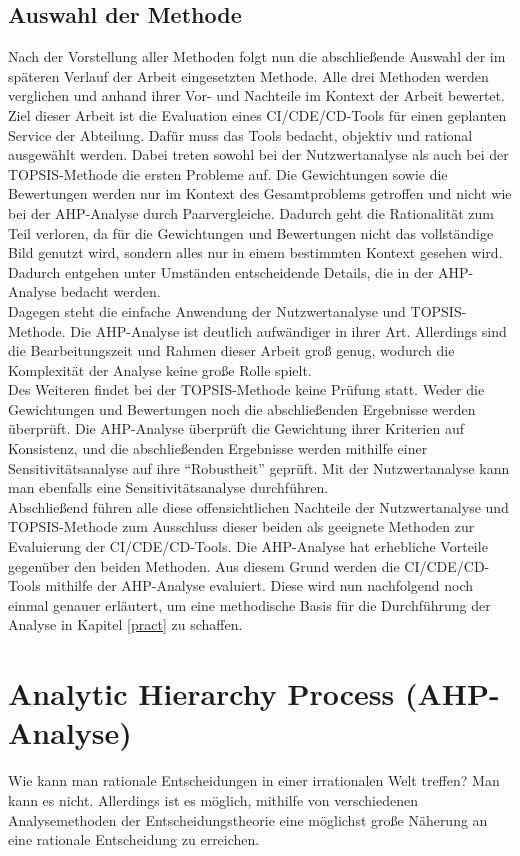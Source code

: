 \subsection{Auswahl der Methode}
Nach der Vorstellung aller Methoden folgt nun die abschließende Auswahl der im späteren Verlauf der Arbeit eingesetzten Methode. Alle drei Methoden werden verglichen und anhand ihrer Vor- und Nachteile im Kontext der Arbeit bewertet.\\
Ziel dieser Arbeit ist die Evaluation eines \ac{CI}/\ac{CDE}/\ac{CD}-Tools für einen geplanten Service der Abteilung. Dafür muss das Tools bedacht, objektiv und rational ausgewählt werden. Dabei treten sowohl bei der Nutzwertanalyse als auch bei der TOPSIS-Methode die ersten Probleme auf. Die Gewichtungen sowie die Bewertungen werden nur im Kontext des Gesamtproblems getroffen und nicht wie bei der AHP-Analyse durch Paarvergleiche. Dadurch geht die Rationalität zum Teil verloren, da für die Gewichtungen und Bewertungen nicht das vollständige Bild genutzt wird, sondern alles nur in einem bestimmten Kontext gesehen wird. Dadurch entgehen unter Umständen entscheidende Details, die in der AHP-Analyse bedacht werden.\\
Dagegen steht die einfache Anwendung der Nutzwertanalyse und TOPSIS-Methode. Die AHP-Analyse ist deutlich aufwändiger in ihrer Art. Allerdings sind die Bearbeitungszeit und Rahmen dieser Arbeit groß genug, wodurch die Komplexität der Analyse keine große Rolle spielt.\\
Des Weiteren findet bei der TOPSIS-Methode keine Prüfung statt. Weder die Gewichtungen und Bewertungen noch die abschließenden Ergebnisse werden überprüft. Die AHP-Analyse überprüft die Gewichtung ihrer Kriterien auf Konsistenz, und die abschließenden Ergebnisse werden mithilfe einer Sensitivitätsanalyse auf ihre \enquote{Robustheit} geprüft. Mit der Nutzwertanalyse kann man ebenfalls eine Sensitivitätsanalyse durchführen.\\
Abschließend führen alle diese offensichtlichen Nachteile der Nutzwertanalyse und TOPSIS-Methode zum Ausschluss dieser beiden als geeignete Methoden zur Evaluierung der \ac{CI}/\ac{CDE}/\ac{CD}-Tools. Die AHP-Analyse hat erhebliche Vorteile gegenüber den beiden Methoden. Aus diesem Grund werden die \ac{CI}/\ac{CDE}/\ac{CD}-Tools mithilfe der AHP-Analyse evaluiert. Diese wird nun nachfolgend noch einmal genauer erläutert, um eine methodische Basis für die Durchführung der Analyse in Kapitel \ref{pract} zu schaffen.
\section{Analytic Hierarchy Process (AHP-Analyse)}\label{ahp}
Wie kann man rationale Entscheidungen in einer irrationalen Welt treffen? Man kann es nicht. Allerdings ist es möglich, mithilfe von verschiedenen Analysemethoden der Entscheidungstheorie eine möglichst große Näherung an eine rationale Entscheidung zu erreichen. 
